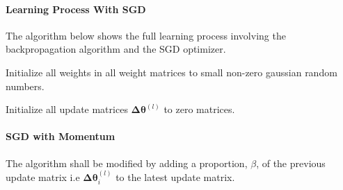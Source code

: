 \documentclass{article}
\begin{document}
\paragraph{Learning Process With SGD}
The algorithm below shows the full learning process involving the backpropagation algorithm and the SGD optimizer.
\begin{algorithm}
	\SetAlgoLined
	
	Initialize all weights in all weight matrices to small non-zero gaussian random numbers.
	
	Initialize all update matrices $\boldsymbol{\Delta\theta}^{(l)}$ to zero matrices.
	
\end{algorithm}

\paragraph{SGD with Momentum}

The algorithm shall be modified by adding a proportion, $\beta$, of the previous update matrix i.e $\boldsymbol{\Delta\theta}^{(l)}_i$ to the latest update matrix.
\end{document}
